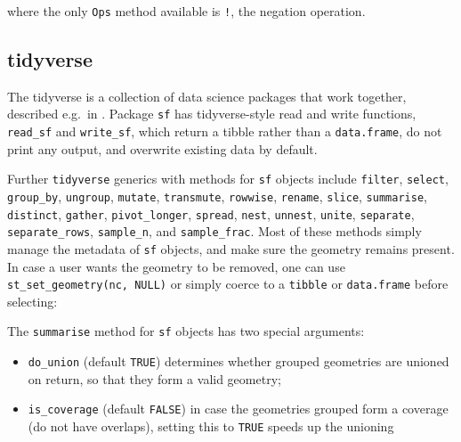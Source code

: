 \documentclass[]{book}
\newenvironment{Shaded}{\begin{snugshade}}{\end{snugshade}}
\newcommand{\CommentTok}[1]{\textcolor[rgb]{0.56,0.35,0.01}{\textit{#1}}}
\newcommand{\DecValTok}[1]{\textcolor[rgb]{0.00,0.00,0.81}{#1}}
\newcommand{\KeywordTok}[1]{\textcolor[rgb]{0.13,0.29,0.53}{\textbf{#1}}}
\newcommand{\NormalTok}[1]{#1}
\newcommand{\OperatorTok}[1]{\textcolor[rgb]{0.81,0.36,0.00}{\textbf{#1}}}
\newcommand{\StringTok}[1]{\textcolor[rgb]{0.31,0.60,0.02}{#1}}
\providecommand{\tightlist}{%
  \setlength{\itemsep}{0pt}\setlength{\parskip}{0pt}}
\begin{document}
where the only \texttt{Ops} method available is \texttt{!}, the negation operation.

\hypertarget{tidyverse}{%
\subsection{tidyverse}\label{tidyverse}}

The tidyverse is a collection of data science packages that work
together, described e.g.~in \citep{r4ds, welcome}. Package \texttt{sf} has
tidyverse-style read and write functions, \texttt{read\_sf} and \texttt{write\_sf},
which return a tibble rather than a \texttt{data.frame}, do not print any
output, and overwrite existing data by default.

Further \texttt{tidyverse} generics with methods for \texttt{sf} objects include
\texttt{filter}, \texttt{select}, \texttt{group\_by}, \texttt{ungroup}, \texttt{mutate}, \texttt{transmute},
\texttt{rowwise}, \texttt{rename}, \texttt{slice}, \texttt{summarise}, \texttt{distinct}, \texttt{gather}, \texttt{pivot\_longer},
\texttt{spread}, \texttt{nest}, \texttt{unnest}, \texttt{unite}, \texttt{separate}, \texttt{separate\_rows},
\texttt{sample\_n}, and \texttt{sample\_frac}. Most of these methods simply manage
the metadata of \texttt{sf} objects, and make sure the geometry remains
present. In case a user wants the geometry to be removed, one can
use \texttt{st\_set\_geometry(nc,\ NULL)} or simply coerce to a \texttt{tibble} or
\texttt{data.frame} before selecting:

\begin{Shaded}
\end{Shaded}

The \texttt{summarise} method for \texttt{sf} objects has two special arguments:

\begin{itemize}
\tightlist
\item
  \texttt{do\_union} (default \texttt{TRUE}) determines whether grouped geometries are unioned on return, so that they form a valid geometry;
\item
  \texttt{is\_coverage} (default \texttt{FALSE}) in case the geometries grouped form a coverage (do not have overlaps), setting this to \texttt{TRUE} speeds up the unioning
\end{itemize}
\end{document}
